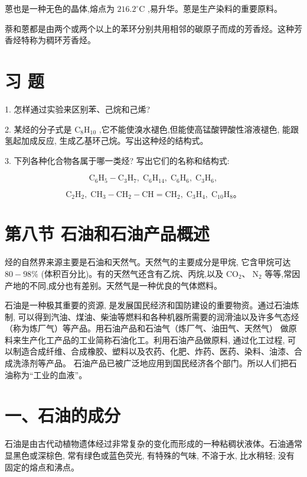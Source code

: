 \documentclass[10pt]{article}
\begin{document}
蒽也是一种无色的晶体,熔点为 \({216.2}^{ \circ }\mathrm{C}\) ,易升华。蒽是生产染料的重要原料。

萘和蒽都是由两个或两个以上的苯环分别共用相邻的碳原子而成的芳香烃。这种芳香烃特称为稠环芳香烃。

\section*{习 题}

1. 怎样通过实验来区别苯、己烷和己烯?

2. 某烃的分子式是 \({\mathrm{C}}_{8}{\mathrm{H}}_{10}\) ,它不能使溴水褪色,但能使高锰酸钾酸性溶液褪色, 能跟氢起加成反应, 生成乙基环己烷。写出这种烃的结构式。

3. 下列各种化合物各属于哪一类烃? 写出它们的名称和结构式:

\[
{\mathrm{C}}_{6}{\mathrm{H}}_{5} - {\mathrm{C}}_{3}{\mathrm{H}}_{7},\;{\mathrm{C}}_{6}{\mathrm{H}}_{14},\;{\mathrm{C}}_{6}{\mathrm{H}}_{6},\;{\mathrm{C}}_{3}{\mathrm{H}}_{6},
\]

\[
{\mathrm{C}}_{2}{\mathrm{H}}_{2},\;{\mathrm{{CH}}}_{3} - {\mathrm{{CH}}}_{2} - \mathrm{{CH}} = {\mathrm{{CH}}}_{2},\;{\mathrm{C}}_{3}{\mathrm{H}}_{4},\;{\mathrm{C}}_{10}{\mathrm{H}}_{8}。
\]

\section*{第八节 石油和石油产品概述}

烃的自然界来源主要是石油和天然气。天然气的主要成分是甲烷, 它含甲烷可达 \({80} - {98}\%\) (体积百分比)。有的天然气还含有乙烷、丙烷,以及 \({\mathrm{{CO}}}_{2}\text{、}{\mathrm{\;N}}_{2}\) 等等,常因产地的不同,成分也有差别。天然气是一种优良的气体燃料。

石油是一种极其重要的资源, 是发展国民经济和国防建设的重要物资。通过石油炼制, 可以得到汽油、煤油、柴油等燃料和各种机器所需要的润滑油以及许多气态烃（称为炼厂气）等产品。用石油产品和石油气（炼厂气、油田气、天然气） 做原料来生产化工产品的工业简称石油化工。利用石油产品做原料, 通过化工过程, 可以制造合成纤维、合成橡胶、塑料以及农药、化肥、炸药、医药、染料、油漆、合成洗涤剂等产品。 石油产品已被广泛地应用到国民经济各个部门。所以人们把石油称为“工业的血液”。

\section*{一、石油的成分}

石油是由古代动植物遗体经过非常复杂的变化而形成的一种粘稠状液体。石油通常显黑色或深棕色, 常有绿色或蓝色荧光, 有特殊的气味, 不溶于水, 比水稍轻; 没有固定的熔点和沸点。
\end{document}
